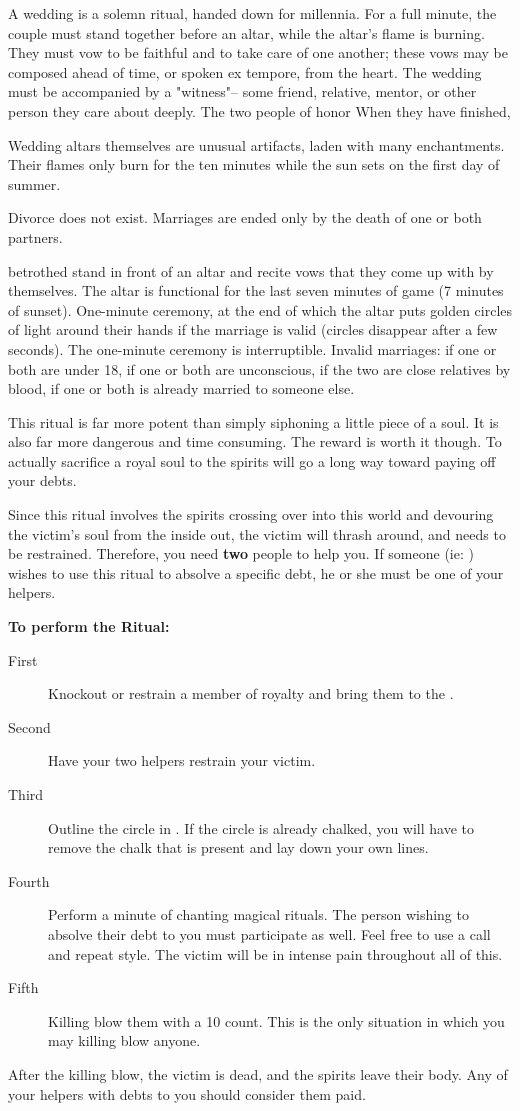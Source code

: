 \documentclass[green]{Kos}
\begin{document}
\name{\gWedding{}}

A wedding is a solemn ritual, handed down for millennia. For a full minute, the couple must stand together before an altar, while the altar's flame is burning. They must vow to be faithful and to take care of one another; these vows may be composed ahead of time, or spoken ex tempore, from the heart. The wedding must be accompanied by a "witness"-- some friend, relative, mentor, or other person they care about deeply. The two people of honor When they have finished, 

Wedding altars themselves are unusual artifacts, laden with many enchantments. Their flames only burn for the ten minutes while the sun sets on the first day of summer. 

Divorce does not exist. Marriages are ended only by the death of one or both partners.

 betrothed stand in front of an altar and recite vows that they come up with by themselves. The altar is functional for the last seven minutes of game (7 minutes of sunset). One-minute ceremony, at the end of which the altar puts golden circles of light around their hands if the marriage is valid (circles disappear after a few seconds). The one-minute ceremony is interruptible. Invalid marriages: if one or both are under 18, if one or both are unconscious, if the two are close relatives by blood, if one or both is already married to someone else.

This ritual is far more potent than simply siphoning a little piece of a soul. It is also far more dangerous and time consuming. The reward is worth it though. To actually sacrifice a royal soul to the spirits will go a long way toward paying off your debts.

Since this ritual involves the spirits crossing over into this world and devouring the victim's soul from the inside out, the victim will thrash around, and needs to be restrained. Therefore, you need {\bf two} people to help you. If someone (ie: \cAriel{}) wishes to use this ritual to absolve a specific debt, he or she must be one of your helpers.

{\bf To perform the Ritual:}
\begin{description}
\item[First] Knockout or restrain a member of royalty and bring them to the \sRunicCircle{}.
\item[Second] Have your two helpers restrain your victim.
\item [Third] Outline the circle in \iChalk{\MYname}. If the circle is already chalked, you will have to remove the chalk that is present and lay down your own lines.
\item[Fourth] Perform a minute of chanting magical rituals. The person wishing to absolve their debt to you must participate as well. Feel free to use a call and repeat style. The victim will be in intense pain throughout all of this.
\item[Fifth] Killing blow them with a 10 count. This is the only situation in which you may killing blow anyone.
\end{description}

After the killing blow, the victim is dead, and the spirits leave their body. Any of your helpers with debts to you should consider them paid.
\end{document}
